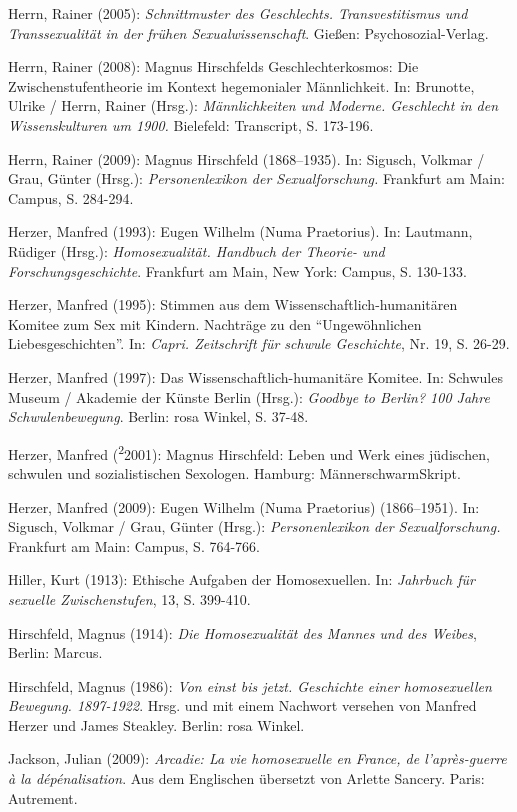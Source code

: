 \documentclass[a4paper,
fontsize=11pt,
oneside,
numbers=noperiodatend,
parskip=half-,
bibliography=totoc,
final
]{scrartcl}
\begin{document}
Herrn, Rainer (2005): \emph{Schnittmuster des Geschlechts.
Transvestitismus und Transsexualität in der frühen Sexualwissenschaft}.
Gießen: Psychosozial-Verlag.

Herrn, Rainer (2008): Magnus Hirschfelds Geschlechterkosmos: Die
Zwischenstufentheorie im Kontext hegemonialer Männlichkeit. In:
Brunotte, Ulrike / Herrn, Rainer (Hrsg.): \emph{Männlichkeiten und
Moderne. Geschlecht in den Wissenskulturen um 1900.} Bielefeld:
Transcript, S. 173-196.

Herrn, Rainer (2009): Magnus Hirschfeld (1868--1935). In: Sigusch,
Volkmar / Grau, Günter (Hrsg.): \emph{Personenlexikon der
Sexualforschung.} Frankfurt am Main: Campus, S. 284-294.

Herzer, Manfred (1993): Eugen Wilhelm (Numa Praetorius). In: Lautmann,
Rüdiger (Hrsg.): \emph{Homosexualität. Handbuch der Theorie- und
Forschungsgeschichte}. Frankfurt am Main, New York: Campus, S. 130-133.

Herzer, Manfred (1995): Stimmen aus dem Wissenschaftlich-humanitären
Komitee zum Sex mit Kindern. Nachträge zu den \enquote{Ungewöhnlichen
Liebesgeschichten}. In: \emph{Capri. Zeitschrift für schwule
Geschichte}, Nr. 19, S. 26-29.

Herzer, Manfred (1997): Das Wissenschaftlich-humanitäre Komitee. In:
Schwules Museum / Akademie der Künste Berlin (Hrsg.): \emph{Goodbye to
Berlin? 100 Jahre Schwulenbewegung}. Berlin: rosa Winkel, S. 37-48.

Herzer, Manfred (\textsuperscript{2}2001): Magnus Hirschfeld: Leben und
Werk eines jüdischen, schwulen und sozialistischen Sexologen. Hamburg:
MännerschwarmSkript.

Herzer, Manfred (2009): Eugen Wilhelm (Numa Praetorius) (1866--1951).
In: Sigusch, Volkmar / Grau, Günter (Hrsg.): \emph{Personenlexikon der
Sexualforschung.} Frankfurt am Main: Campus, S. 764-766.

Hiller, Kurt (1913): Ethische Aufgaben der Homosexuellen. In:
\emph{Jahrbuch für sexuelle Zwischenstufen}, 13, S. 399-410.

Hirschfeld, Magnus (1914): \emph{Die Homosexualität des Mannes und des
Weibes}, Berlin: Marcus.

Hirschfeld, Magnus (1986): \emph{Von einst bis jetzt. Geschichte einer
homosexuellen Bewegung. 1897-1922}. Hrsg. und mit einem Nachwort
versehen von Manfred Herzer und James Steakley. Berlin: rosa Winkel.

Jackson, Julian (2009): \emph{Arcadie: La vie homosexuelle en France, de
l'après-guerre à la dépénalisation}. Aus dem Englischen übersetzt von
Arlette Sancery. Paris: Autrement.
\end{document}
